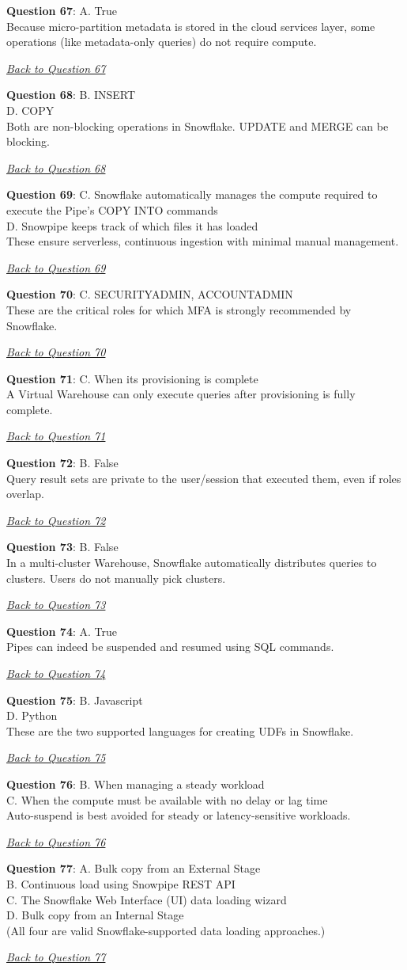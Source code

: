\documentclass[12pt]{article}
\newcommand{\answer}[2]{%
  \textbf{Question #1}\label{ans:#1}: #2\par
  \smallskip\emph{\hyperref[q:#1]{Back to Question #1}}\par\medskip
}
\begin{document}
\answer{67}{A. True \\
Because micro-partition metadata is stored in the cloud services layer, some operations (like metadata-only queries) do not require compute.}

\answer{68}{B. INSERT \\
D. COPY \\
Both are non-blocking operations in Snowflake. UPDATE and MERGE can be blocking.}

\answer{69}{C. Snowflake automatically manages the compute required to execute the Pipe's COPY INTO commands \\
D. Snowpipe keeps track of which files it has loaded \\
These ensure serverless, continuous ingestion with minimal manual management.}

\answer{70}{C. SECURITYADMIN, ACCOUNTADMIN \\
These are the critical roles for which MFA is strongly recommended by Snowflake.}

\answer{71}{C. When its provisioning is complete \\
A Virtual Warehouse can only execute queries after provisioning is fully complete.}

\answer{72}{B. False \\
Query result sets are private to the user/session that executed them, even if roles overlap.}

\answer{73}{B. False \\
In a multi-cluster Warehouse, Snowflake automatically distributes queries to clusters. Users do not manually pick clusters.}

\answer{74}{A. True \\
Pipes can indeed be suspended and resumed using SQL commands.}

\answer{75}{B. Javascript \\
D. Python \\
These are the two supported languages for creating UDFs in Snowflake.}

\answer{76}{B. When managing a steady workload \\
C. When the compute must be available with no delay or lag time \\
Auto-suspend is best avoided for steady or latency-sensitive workloads.}

\answer{77}{A. Bulk copy from an External Stage \\
B. Continuous load using Snowpipe REST API \\
C. The Snowflake Web Interface (UI) data loading wizard \\
D. Bulk copy from an Internal Stage \\
(All four are valid Snowflake-supported data loading approaches.)}
\end{document}
